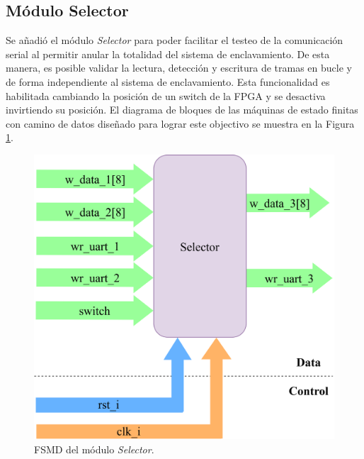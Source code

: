 \subsection{Módulo Selector}
	\label{sec:selector}
	
	Se añadió el módulo \textit{Selector} para poder facilitar el testeo de la comunicación serial al permitir anular la totalidad del sistema de enclavamiento. De esta manera, es posible validar la lectura, detección y escritura de tramas en bucle y de forma independiente al sistema de enclavamiento. Esta funcionalidad es habilitada cambiando la posición de un switch de la FPGA y se desactiva invirtiendo su posición. El diagrama de bloques de las máquinas de estado finitas con camino de datos diseñado para lograr este objectivo se muestra en la Figura \ref{fig:Selector_module}.
	
	\begin{figure}[H]
		\centering
		\includegraphics[width=1\textwidth]{Figuras/Selector_module.png}
		\centering\caption{FSMD del módulo \textit{Selector}.}
		\label{fig:Selector_module}
	\end{figure}